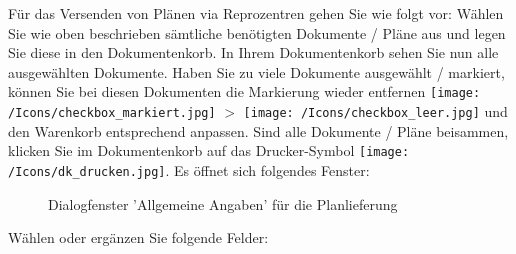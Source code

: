 \vspace{\baselineskip}

Für das Versenden von Plänen via Reprozentren gehen Sie wie folgt vor: Wählen Sie wie oben beschrieben sämtliche benötigten Dokumente / Pläne aus und legen Sie diese in den Dokumentenkorb. In Ihrem Dokumentenkorb sehen Sie nun alle ausgewählten Dokumente. Haben Sie zu viele Dokumente ausgewählt / markiert, können Sie bei diesen Dokumenten die Markierung wieder entfernen \texttt{[image: /Icons/checkbox\_markiert.jpg]} $ > $ \texttt{[image: /Icons/checkbox\_leer.jpg]} und den Warenkorb entsprechend anpassen. Sind alle Dokumente / Pläne beisammen, klicken Sie im Dokumentenkorb auf das Drucker-Symbol \texttt{[image: /Icons/dk\_drucken.jpg]}. Es öffnet sich folgendes Fenster:

\begin{figure}[H]
\caption{Dialogfenster 'Allgemeine Angaben' für die Planlieferung}
\end{figure}

Wählen oder ergänzen Sie folgende Felder:

